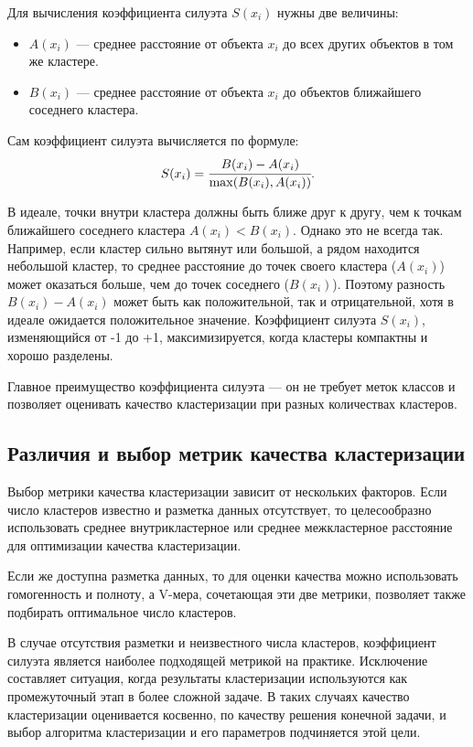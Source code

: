Для вычисления коэффициента силуэта $S(x_i)$ нужны две величины:

\begin{itemize}
    \item $A(x_i)$ — среднее расстояние от объекта $x_i$ до всех других объектов в том же кластере.
    \item $B(x_i)$ — среднее расстояние от объекта $x_i$ до объектов ближайшего соседнего кластера.
\end{itemize}

Сам коэффициент силуэта вычисляется по формуле:
\begin{equation*}
    S(x_i) = \cfrac{B(x_i)-A(x_i)}{\max (B(x_i), A(x_i))}.
\end{equation*}

В идеале, точки внутри кластера должны быть ближе друг к другу, чем к точкам ближайшего соседнего кластера $A(x_i) < B(x_i)$. Однако это не всегда так.  Например, если кластер сильно вытянут или большой, а рядом находится небольшой кластер, то среднее расстояние до точек своего кластера ($A(x_i)$) может оказаться больше, чем до точек соседнего ($B(x_i)$).  Поэтому разность $B(x_i) - A(x_i)$ может быть как положительной, так и отрицательной, хотя в идеале ожидается положительное значение.  Коэффициент силуэта $S(x_i)$, изменяющийся от -1 до +1, максимизируется, когда кластеры компактны и хорошо разделены.

Главное преимущество коэффициента силуэта — он не требует меток классов и позволяет оценивать качество кластеризации при разных количествах кластеров.

\subsection{Различия и выбор метрик качества кластеризации}

Выбор метрики качества кластеризации зависит от нескольких факторов. Если число кластеров известно и разметка данных отсутствует, то целесообразно использовать среднее внутрикластерное или среднее межкластерное расстояние для оптимизации качества кластеризации. 

Если же доступна разметка данных, то для оценки качества можно использовать гомогенность и полноту, а V-мера, сочетающая эти две метрики, позволяет также подбирать оптимальное число кластеров.

В случае отсутствия разметки и неизвестного числа кластеров, коэффициент силуэта является наиболее подходящей метрикой на практике. Исключение составляет ситуация, когда результаты кластеризации используются как промежуточный этап в более сложной задаче. В таких случаях качество кластеризации оценивается косвенно, по качеству решения конечной задачи, и выбор алгоритма кластеризации и его параметров подчиняется этой цели.

